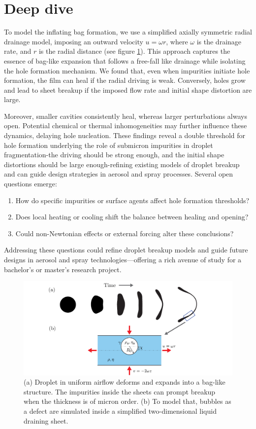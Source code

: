 \documentclass[a4paper,10pt]{article}
\begin{document}
\section*{Deep dive}

To model the inflating bag formation, we use a simplified axially symmetric radial drainage model, imposing an outward velocity $u = \omega r$, where $\omega$ is the drainage rate, and $r$ is the radial distance (see figure \ref{fig:droplets2021}). This approach captures the essence of bag-like expansion that follows a free-fall like drainage while isolating the hole formation mechanism.
We found that, even when impurities initiate hole formation, the film can heal if the radial driving is weak. Conversely, holes grow and lead to sheet breakup if the imposed flow rate and initial shape distortion are large.

Moreover, smaller cavities consistently heal, whereas larger perturbations always open. Potential chemical or thermal inhomogeneities may further influence these dynamics, delaying hole nucleation. These findings reveal a double threshold for hole formation underlying the role of submicron impurities in droplet fragmentation-the driving should be strong enough, and the initial shape distortions should be large enough-refining existing models of droplet breakup and can guide design strategies in aerosol and spray processes.
Several open questions emerge: 

\begin{enumerate}
  \item How do specific impurities or surface agents affect hole formation thresholds? 
  \item Does local heating or cooling shift the balance between healing and opening?
  \item  Could non-Newtonian effects or external forcing alter these conclusions?
\end{enumerate}

Addressing these questions could refine droplet breakup models and guide future designs in aerosol and spray technologies—offering a rich avenue of study for a bachelor's or master's research project.

\begin{figure}
\centering
\includegraphics[width=\textwidth]{schematic_02.pdf}
\caption{(a) Droplet in uniform airflow deforms and expands into a bag-like structure. The impurities inside the sheets can prompt breakup when the thickness is of micron order. (b) To model that, bubbles as a defect are simulated inside a simplified two-dimensional liquid draining sheet.}
\label{fig:droplets2021}
\end{figure}
\end{document}
